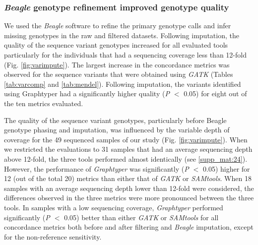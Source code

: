 \documentclass[../main.tex]{subfiles}
\begin{document}
\subsubsection*{\emph{Beagle} genotype refinement improved genotype quality}

We used the \emph{Beagle} software to refine the primary genotype calls and infer missing genotypes in the raw and filtered datasets. 
Following imputation, the quality of the sequence variant genotypes increased for all evaluated tools particularly for the individuals that had a sequencing coverage less than 12-fold (Fig. \ref{fig:varimpute}). 
The largest increase in the concordance metrics was observed for the sequence variants that were obtained using \emph{GATK} (Tables \ref{tab:varcomp} and \ref{tab:mendel}). 
Following imputation, the variants identified using Graphtyper had a significantly higher quality (\emph{P $<$} 0.05) for eight out of the ten metrics evaluated.

The quality of the sequence variant genotypes, particularly before Beagle genotype phasing and imputation, was influenced by the variable depth of coverage for the 49 sequenced samples of our study (Fig. \ref{fig:varimpute}). 
When we restricted the evaluations to 31 samples that had an average sequencing depth above 12-fold, the three tools performed almost identically (see \ref{supp_mat:24}). 
However, the performance of \emph{Graphtyper} was significantly (\emph{P $<$} 0.05) higher for 12 (out of the total 20) metrics than either that of \emph{GATK} or \emph{SAMtools}. 
When 18 samples with an average sequencing depth lower than 12-fold were considered, the differences observed in the three metrics were more pronounced between the three tools. 
In samples with a low sequencing coverage, \emph{Graphtyper} performed significantly (\emph{P $<$} 0.05) better than either \emph{GATK} or \emph{SAMtools} for all concordance metrics both before and after filtering and \emph{Beagle} imputation, except for the non-reference sensitivity.
\end{document}
